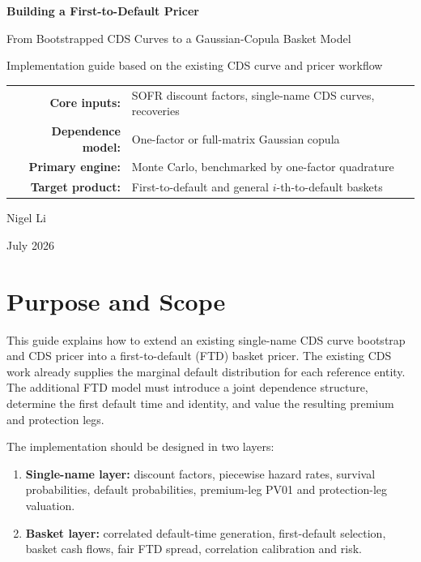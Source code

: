 \documentclass[11pt,a4paper]{article}
\begin{document}
\begin{titlepage}
\centering
\vspace*{2.0cm}
{\Huge\bfseries\color{navy} Building a First-to-Default Pricer\par}
\vspace{0.4cm}
{\Large From Bootstrapped CDS Curves to a Gaussian-Copula Basket Model\par}
\vspace{1.3cm}
{\large Implementation guide based on the existing CDS curve and pricer workflow\par}
\vfill
\begin{tabular}{rl}
\textbf{Core inputs:} & SOFR discount factors, single-name CDS curves, recoveries \\
\textbf{Dependence model:} & One-factor or full-matrix Gaussian copula \\
\textbf{Primary engine:} & Monte Carlo, benchmarked by one-factor quadrature \\
\textbf{Target product:} & First-to-default and general $i$-th-to-default baskets
\end{tabular}
\vfill
{\large Nigel Li\par}
{\small July 2026\par}
\end{titlepage}

\tableofcontents
\newpage

\section{Purpose and Scope}

This guide explains how to extend an existing single-name CDS curve bootstrap and CDS pricer into a first-to-default (FTD) basket pricer. The existing CDS work already supplies the marginal default distribution for each reference entity. The additional FTD model must introduce a joint dependence structure, determine the first default time and identity, and value the resulting premium and protection legs.

The implementation should be designed in two layers:

\begin{enumerate}
    \item \textbf{Single-name layer:} discount factors, piecewise hazard rates, survival probabilities, default probabilities, premium-leg PV01 and protection-leg valuation.
    \item \textbf{Basket layer:} correlated default-time generation, first-default selection, basket cash flows, fair FTD spread, correlation calibration and risk.
\end{enumerate}
\end{document}
